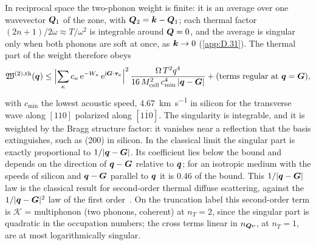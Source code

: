 In reciprocal space the two-phonon weight is finite: it is an average over one wavevector $\bm{Q}_1$ of the zone, with $\bm{Q}_2 = \bm{k} - \bm{Q}_1$; each thermal factor $(2n + 1)/2\omega \approx T/\omega^2$ is integrable around $\bm{Q} = 0$, and the average is singular only when both phonons are soft at once, as $\bm{k} \to 0$ (\cref{app:D.31}). The thermal part of the weight therefore obeys
\begin{equation}
  \mathfrak{W}^{(2),\mathrm{th}}(\bm{q}) \le \Bigl|\sum_\kappa c_\kappa\,\mathrm{e}^{-W_\kappa}\,\mathrm{e}^{\mathrm{i}\bm{G}\cdot\bm{\tau}_\kappa}\Bigr|^2\,\frac{\Omega\,T^2q^4}{16\,M_{\mathrm{cell}}^2\,c_{\mathrm{min}}^4\,|\bm{q} - \bm{G}|} + (\text{terms regular at } \bm{q} = \bm{G}) ,
  \label{eq:11.3-tds}
\end{equation}
with $c_{\mathrm{min}}$ the lowest acoustic speed, \SI{4.67}{km.s^{-1}} in silicon for the transverse wave along $[110]$ polarized along $[1\bar10]$. The singularity is integrable, and it is weighted by the Bragg structure factor: it vanishes near a reflection that the basis extinguishes, such as (200) in silicon. In the classical limit the singular part is exactly proportional to $1/|\bm{q} - \bm{G}|$. Its coefficient lies below the bound and depends on the direction of $\bm{q} - \bm{G}$ relative to $\bm{q}$; for an isotropic medium with the speeds of silicon and $\bm{q} - \bm{G}$ parallel to $\bm{q}$ it is 0.46 of the bound. This $1/|\bm{q} - \bm{G}|$ law is the classical result for second-order thermal diffuse scattering, against the $1/|\bm{q} - \bm{G}|^2$ law of the first order~\cite{warren1969xray}. On the truncation label this second-order term is $\mathcal{K}$ = multiphonon (two phonons, coherent) at $n_T = 2$, since the singular part is quadratic in the occupation numbers; the cross terms linear in $n_{\bm{Q}\nu}$, at $n_T = 1$, are at most logarithmically singular.

